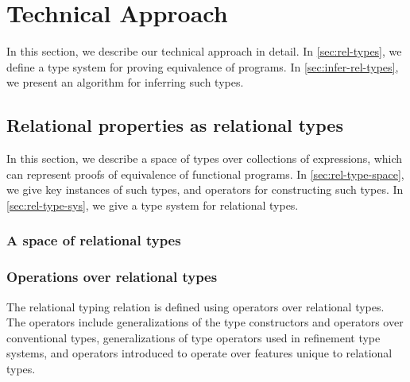 \section{Technical Approach}
%
In this section, we describe our technical approach in detail.
%
In \autoref{sec:rel-types}, we define a type system for proving
equivalence of programs.
%
In \autoref{sec:infer-rel-types}, we present an algorithm for
inferring such types.

\subsection{Relational properties as relational types}
\label{sec:rel-types}
%
In this section, we describe a space of types over collections of
expressions, which can represent proofs of equivalence of functional
programs.
%
In \autoref{sec:rel-type-space}, we give key instances of such types,
and operators for constructing such types.
%
In \autoref{sec:rel-type-sys}, we give a type system for relational
types.

\subsubsection{A space of relational types}
\label{sec:rel-type-space}







\subsubsection{Operations over relational types}
\label{sec:rel-type-space}
%
The relational typing relation is defined using operators over
relational types.
%
The operators include generalizations of the type constructors and
operators over conventional types, generalizations of type operators
used in refinement type systems, and operators introduced to operate
over features unique to relational types.

